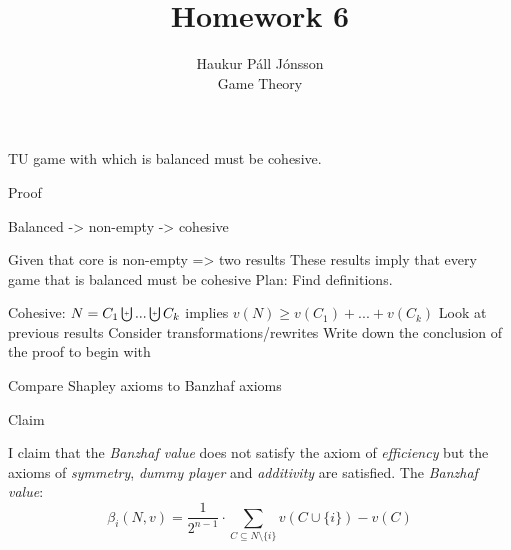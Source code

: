 \documentclass[12pt]{article}
\newenvironment{question}[2][Question]{\begin{trivlist}
\item[\hskip \labelsep {\bfseries #1}\hskip \labelsep {\bfseries #2.}]}{\end{trivlist}}
\newenvironment{answer}[2][Answer]{\begin{trivlist}
\item[\hskip \labelsep {\bfseries #1}\hskip \labelsep {\bfseries #2:}]}{\end{trivlist}}
\begin{document}
\let\oldsum\sum
\renewcommand{\sum}[3]{\oldsum\limits_{#1}^{#2}#3}
\let\oldprod\prod
\renewcommand{\prod}[3]{\oldprod\limits_{#1}^{#2}#3}

\newcommand\Dunion{
  \mathop{\mathchoice
    {\ooalign{$\displaystyle\bigcup$\cr\hss\scalebox{.65}{\raisebox{0.45ex}{\sffamily +}}\hss}}
    {\ooalign{$\textstyle\bigcup$\cr\hss\scalebox{.9}{\raisebox{0.5ex}{\tiny\sffamily +}}\hss}}
    {\ooalign{$\scriptstyle\bigcup$\cr\hss\scalebox{.45}{\raisebox{0.3ex}{\sffamily +}}\hss}}
    {\ooalign{$\scriptscriptstyle\bigcup$\cr\hss\scalebox{.38}{\raisebox{0.3ex}{\sffamily +}}\hss}}
    }
}

\title{Homework 6}
\author{Haukur Páll Jónsson\\
Game Theory}

\maketitle

\begin{question}{1}
TU game with which is balanced must be cohesive.
\end{question}
\begin{answer}{a)}{Proof}

Balanced -> non-empty -> cohesive

Given that core is non-empty => two results
These results imply that every game that is balanced must be cohesive
Plan: Find definitions.

Cohesive: $N = C_1 \Dunion ... \Dunion C_k$ implies $v(N) \geq v(C_1) + ... + v(C_k)$
Look at previous results
Consider transformations/rewrites
Write down the conclusion of the proof to begin with
\end{answer}

\begin{question}{2}
Compare Shapley axioms to Banzhaf axioms
\end{question}
\begin{answer}{a-d)}{Claim}

I claim that the \textit{Banzhaf value} does not satisfy the axiom of \textit{efficiency} but the axioms of \textit{symmetry}, \textit{dummy player} and \textit{additivity} are satisfied. The \textit{Banzhaf value}:
$$\beta_i(N,v)=\frac{1}{2^{n-1}}\cdot \sum{C \subseteq N \setminus \{i\}}{}{v(C \cup \{i\}) - v(C)}$$
\end{answer}
\end{document}

